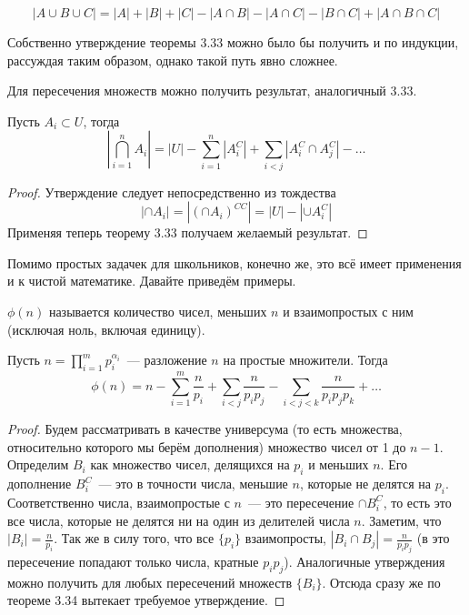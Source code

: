 $$|A\cup B \cup C| = |A| + |B| + |C| - |A\cap B| - |A\cap C| - |B\cap C| + |A\cap B \cap C|$$

Собственно утверждение теоремы 3.33 можно было бы получить и по индукции, рассуждая таким образом, однако такой путь явно сложнее.

Для пересечения множеств можно получить результат, аналогичный 3.33.

\begin{thm}
Пусть $A_i \subset U$, тогда
$$\left|\bigcap_{i=1}^nA_i\right| = |U| - \sum_{i=1}^n|A_i^C| + \sum_{i<j}|A_i^C\cap A_j^C| - \ldots$$
\end{thm}
\begin{proof}
Утверждение следует непосредственно из тождества
$$|\cap A_i| = |(\cap A_i)^{CC}| = |U| - |\cup A_i^C|$$
Применяя теперь теорему 3.33 получаем желаемый результат.
\end{proof}

Помимо простых задачек для школьников, конечно же, это всё имеет применения и к чистой математике. Давайте приведём примеры.

\begin{definition}
 $\phi(n)$ называется количество чисел, меньших $n$ и взаимопростых с ним (исключая ноль, включая единицу).
\end{definition}

\begin{thm}
Пусть $n=\prod_{i=1}^m p_i^{\alpha_i}$~— разложение $n$ на простые множители. Тогда
$$\phi(n) = n - \sum_{i=1}^m\frac{n}{p_i} + \sum_{i<j}\frac{n}{p_ip_j} - \sum_{i<j<k}\frac{n}{p_ip_jp_k} + \ldots$$
\end{thm}
\begin{proof}
Будем рассматривать в качестве универсума (то есть множества, относительно которого мы берём дополнения) множество чисел от 1 до $n-1$. Определим $B_i$ как множество чисел, делящихся на $p_i$ и меньших $n$. Его дополнение $B_i^C$~— это в точности числа, меньшие $n$, которые не делятся на $p_i$. Соответственно числа, взаимопростые с $n$~— это пересечение $\cap B_i^C$, то есть это все числа, которые не делятся ни на один из делителей числа $n$. Заметим, что $|B_i| = \frac{n}{p_i}$. Так же в силу того, что все $\{p_i\}$ взаимопросты, $|B_i\cap B_j| = \frac{n}{p_ip_j}$ (в это пересечение попадают только числа, кратные $p_ip_j$). Аналогичные утверждения можно получить для любых пересечений множеств $\{B_i\}$. Отсюда сразу же по теореме 3.34 вытекает требуемое утверждение.
\end{proof}

